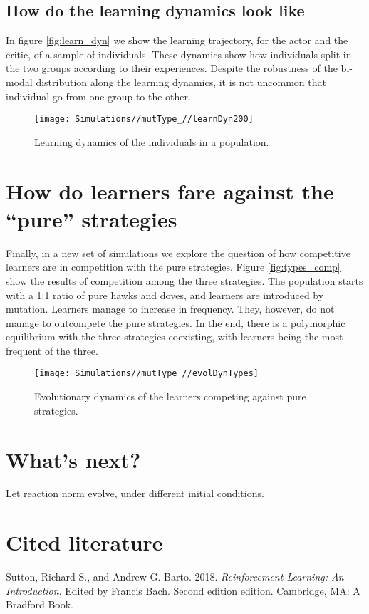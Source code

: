 \documentclass[]{article}
\begin{document}
\hypertarget{how-do-the-learning-dynamics-look-like}{%
\subsection{How do the learning dynamics look
like}\label{how-do-the-learning-dynamics-look-like}}

In figure \ref{fig:learn_dyn} we show the learning trajectory, for the
actor and the critic, of a sample of individuals. These dynamics show
how individuals split in the two groups according to their experiences.
Despite the robustness of the bi-modal distribution along the learning
dynamics, it is not uncommon that individual go from one group to the
other.

\begin{figure}
\texttt{[image: Simulations//mutType\_//learnDyn200]} \caption{\label{fig:learn_dyn}Learning dynamics of the individuals in a population.}\label{fig:fig7}
\end{figure}

\hypertarget{how-do-learners-fare-against-the-pure-strategies}{%
\section{How do learners fare against the ``pure''
strategies}\label{how-do-learners-fare-against-the-pure-strategies}}

Finally, in a new set of simulations we explore the question of how
competitive learners are in competition with the pure strategies. Figure
\ref{fig:types_comp} show the results of competition among the three
strategies. The population starts with a 1:1 ratio of pure hawks and
doves, and learners are introduced by mutation. Learners manage to
increase in frequency. They, however, do not manage to outcompete the
pure strategies. In the end, there is a polymorphic equilibrium with the
three strategies coexisting, with learners being the most frequent of
the three.

\begin{figure}
\texttt{[image: Simulations//mutType\_//evolDynTypes]} \caption{\label{fig:types_comp}Evolutionary dynamics of the learners competing against pure strategies.}\label{fig:fig8}
\end{figure}

\hypertarget{whats-next}{%
\section{What's next?}\label{whats-next}}

Let reaction norm evolve, under different initial conditions.

\hypertarget{cited-literature}{%
\section*{Cited literature}\label{cited-literature}}

\hypertarget{refs}{}
\leavevmode\hypertarget{ref-sutton_reinforcement_2018}{}%
Sutton, Richard S., and Andrew G. Barto. 2018. \emph{Reinforcement
Learning: An Introduction}. Edited by Francis Bach. Second edition
edition. Cambridge, MA: A Bradford Book.
\end{document}
